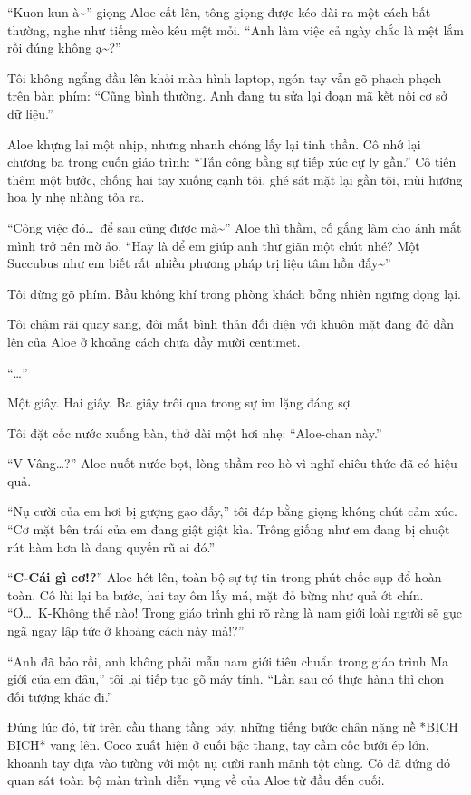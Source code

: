 \documentclass[../main.tex]{subfiles}
\begin{document}
``Kuon-kun à\~{}'' giọng Aloe cất lên, tông giọng được kéo dài ra một cách bất thường, nghe như tiếng mèo kêu mệt mỏi. ``Anh làm việc cả ngày chắc là mệt lắm rồi đúng không ạ\~{}?''

Tôi không ngẩng đầu lên khỏi màn hình laptop, ngón tay vẫn gõ phạch phạch trên bàn phím: ``Cũng bình thường. Anh đang tu sửa lại đoạn mã kết nối cơ sở dữ liệu.''

Aloe khựng lại một nhịp, nhưng nhanh chóng lấy lại tinh thần. Cô nhớ lại chương ba trong cuốn giáo trình: ``Tấn công bằng sự tiếp xúc cự ly gần.'' Cô tiến thêm một bước, chống hai tay xuống cạnh tôi, ghé sát mặt lại gần tôi, mùi hương hoa ly nhẹ nhàng tỏa ra.

``Công việc đó\dots\ để sau cũng được mà\~{}'' Aloe thì thầm, cố gắng làm cho ánh mắt mình trở nên mờ ảo. ``Hay là để em giúp anh thư giãn một chút nhé? Một Succubus như em biết rất nhiều phương pháp trị liệu tâm hồn đấy\~{}''

Tôi dừng gõ phím. Bầu không khí trong phòng khách bỗng nhiên ngưng đọng lại.

Tôi chậm rãi quay sang, đôi mắt bình thản đối diện với khuôn mặt đang đỏ dần lên của Aloe ở khoảng cách chưa đầy mười centimet.

``\dots''

Một giây. Hai giây. Ba giây trôi qua trong sự im lặng đáng sợ.

Tôi đặt cốc nước xuống bàn, thở dài một hơi nhẹ: ``Aloe-chan này.''

``V-Vâng\dots?'' Aloe nuốt nước bọt, lòng thầm reo hò vì nghĩ chiêu thức đã có hiệu quả.

``Nụ cười của em hơi bị gượng gạo đấy,'' tôi đáp bằng giọng không chút cảm xúc. ``Cơ mặt bên trái của em đang giật giật kìa. Trông giống như em đang bị chuột rút hàm hơn là đang quyến rũ ai đó.''

``\textbf{C-Cái gì cơ!?}'' Aloe hét lên, toàn bộ sự tự tin trong phút chốc sụp đổ hoàn toàn. Cô lùi lại ba bước, hai tay ôm lấy má, mặt đỏ bừng như quả ớt chín. ``Ơ\dots\ K-Không thể nào! Trong giáo trình ghi rõ ràng là nam giới loài người sẽ gục ngã ngay lập tức ở khoảng cách này mà!?''

``Anh đã bảo rồi, anh không phải mẫu nam giới tiêu chuẩn trong giáo trình Ma giới của em đâu,'' tôi lại tiếp tục gõ máy tính. ``Lần sau có thực hành thì chọn đối tượng khác đi.''

Đúng lúc đó, từ trên cầu thang tầng bảy, những tiếng bước chân nặng nề *BỊCH BỊCH* vang lên. Coco xuất hiện ở cuối bậc thang, tay cầm cốc bưởi ép lớn, khoanh tay dựa vào tường với một nụ cười ranh mãnh tột cùng. Cô đã đứng đó quan sát toàn bộ màn trình diễn vụng về của Aloe từ đầu đến cuối.
\end{document}
